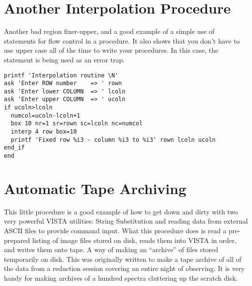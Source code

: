 
\section{Another Interpolation Procedure}

Another bad region fixer-upper, and a good example of a simple use of
 statements for flow control in a procedure. It also shows
that you don't have to use upper case all of the time to write your
procedures.  In this case, the  statement is being used as an
error trap.

\begin{verbatim}
printf 'Interpolation routine \N'
ask 'Enter ROW number    => ' rown
ask 'Enter lower COLUMN  => ' lcoln
ask 'Enter upper COLUMN  => ' ucoln
if ucoln>lcoln
  numcol=ucoln-lcoln+1
  box 10 nr=1 sr=rown sc=lcoln nc=numcol
  interp 4 row box=10
  printf 'Fixed row %i3 - column %i3 to %i3' rown lcoln ucoln
end_if
end
\end{verbatim}


\section{Automatic Tape Archiving}

This little procedure is a good example of how to get down and dirty with two
very powerful VISTA utilities:  String Substitution and reading data from
external ASCII files to provide command input.  What this procedure does is
read a pre-prepared listing of image files stored on disk, reads them into
VISTA in order, and writes them onto tape.  A way of making an ``archive'' of
files stored temporarily on disk.  This was originally written to make a tape
archive of all of the data from a reduction session covering an entire night
of observing.  It is very handy for making archives of a hundred spectra
cluttering up the scratch disk.

